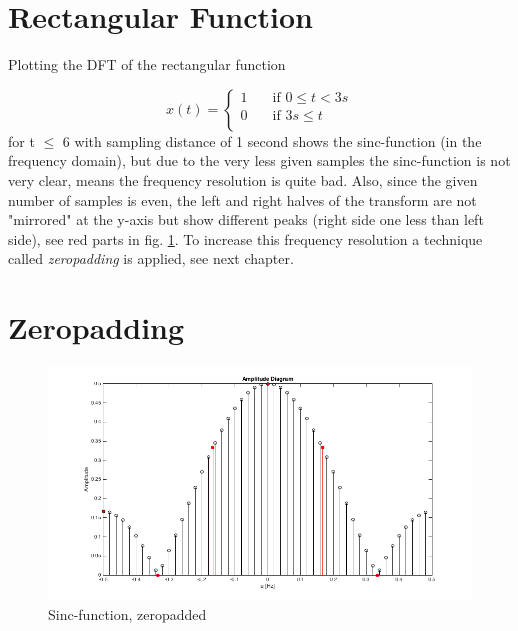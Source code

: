 \documentclass[12pt]{article}
\begin{document}
%
%


\addtocounter{section}{1}

\addtocounter{section}{1}

\section{Rectangular Function}
\label{rect}
Plotting the DFT of the rectangular function

\[ x(t) =
  \begin{cases}
    1       & \quad \text{if }  0 \leq t < 3s \\
    0  		& \quad \text{if }  3s \leq t \\
  \end{cases}
\]
for t $\leq$ 6 with sampling distance of 1 second  shows  the sinc-function (in the frequency domain), but due to the very less given samples the sinc-function is not very clear, means the frequency resolution is quite bad. Also, since the given number of samples is even, the left and right halves of the transform are not "mirrored" at the y-axis but show different peaks (right side one less than left side), see red parts in fig. \ref{fig:mirror}. To increase this frequency resolution a technique called \textit{zeropadding} is applied, see next chapter.

\section{Zeropadding}

\begin{figure}[h!]
	\centering
	\includegraphics[width=\linewidth]{images/ass1_8_9}	
	\caption{Sinc-function, zeropadded}
	\label{fig:mirror}
\end{figure}
\end{document}

